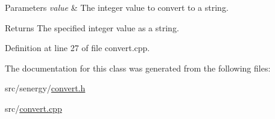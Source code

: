 \begin{DoxyParams}{Parameters}
{\em value} & The integer value to convert to a string.\\
\hline
\end{DoxyParams}
\begin{DoxyReturn}{Returns}
The specified integer value as a string. 
\end{DoxyReturn}


Definition at line 27 of file convert.\-cpp.



The documentation for this class was generated from the following files\-:\begin{DoxyCompactItemize}
\item 
src/senergy/\hyperlink{convert_8h}{convert.\-h}\item 
src/\hyperlink{convert_8cpp}{convert.\-cpp}\end{DoxyCompactItemize}
